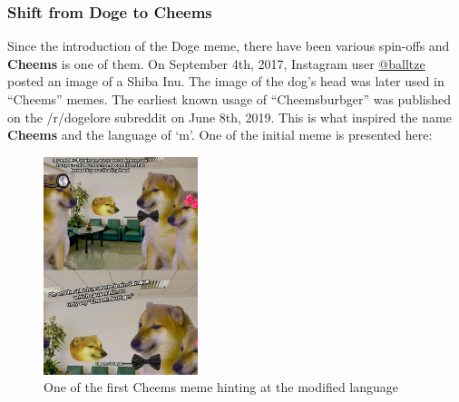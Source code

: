 \def\DevnagVersion{2.17}\documentclass{article}
\begin{document}
\subsubsection{Shift from Doge to Cheems}
Since the introduction of the Doge meme, there have been various spin-offs and \textbf{Cheems} is one of them. On September 4th, 2017, Instagram user \href{https://www.instagram.com/balltze}{@balltze} posted an image of a Shiba Inu. The image of the dog's head was later used in ``Cheems'' memes. The earliest known usage of ``Cheemsburbger'' was published on the /r/dogelore subreddit on June 8th, 2019. This is what inspired the name \textbf{Cheems} and the language of `m'. One of the initial meme is presented here:
\begin{figure}[H]
    \centering
    \includegraphics[width=0.4\textwidth]{figures/cheems_1.jpg}
    \caption{One of the first Cheems meme hinting at the modified language}
\end{figure}
\end{document}
